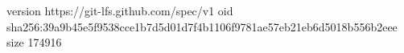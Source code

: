 version https://git-lfs.github.com/spec/v1
oid sha256:39a9b45e5f9538cce1b7d5d01d7f4b1106f9781ae57eb21eb6d5018b556b2eee
size 174916
